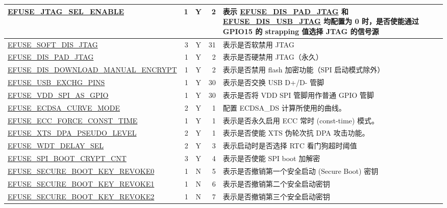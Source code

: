 \begin{longtable}[l]{ |m{8.2cm}|r|c|r|m{9.3cm}| }
    \hline
    \hyperref[fielddesc:EFUSEJTAGSELENABLE]{EFUSE\_JTAG\_SEL\_ENABLE} & 1 & Y & 2 & 表示 \hyperref[fielddesc:EFUSEDISPADJTAG]{EFUSE\_DIS\_PAD\_JTAG} 和 \hyperref[fielddesc:EFUSEDISUSBJTAG]{EFUSE\_DIS\_USB\_JTAG} 均配置为 0 时，是否使能通过 GPIO15 的 strapping 值选择 JTAG 的信号源\\
    \hline
    \hyperref[fielddesc:EFUSESOFTDISJTAG]{EFUSE\_SOFT\_DIS\_JTAG} & 3 & Y & 31 & 表示是否软禁用 JTAG\\
    \hline
    \hyperref[fielddesc:EFUSEDISPADJTAG]{EFUSE\_DIS\_PAD\_JTAG} & 1 & Y & 2 & 表示是否硬禁用 JTAG（永久） \\
    \hline
    \hyperref[fielddesc:EFUSEDISDOWNLOADMANUALENCRYPT]{EFUSE\_DIS\_DOWNLOAD\_MANUAL\_ENCRYPT} &  1 & Y & 2 & 表示是否禁用 flash 加密功能（SPI 启动模式除外）\\
    \hline
    \hyperref[fielddesc:EFUSEUSBEXCHGPINS]{EFUSE\_USB\_EXCHG\_PINS} & 1 & Y & 30 & 表示是否交换 USB D+/D- 管脚 \\
    \hline
    \hyperref[fielddesc:EFUSEVDDSPIASGPIO]{EFUSE\_VDD\_SPI\_AS\_GPIO} & 1 & Y & 30 & 表示是否将 VDD SPI 管脚用作普通 GPIO 管脚 \\
    \hline
    \hyperref[fielddesc:EFUSEECDSACURVEMODE]{EFUSE\_ECDSA\_CURVE\_MODE} & 2 & Y & 1 & 配置 ECDSA\_DS 计算所使用的曲线。 \\ \hline
    \hyperref[fielddesc:EFUSEECCFORCECONSTTIME]{EFUSE\_ECC\_FORCE\_CONST\_TIME}  & 1 & Y & 1 & 表示是否永久启用 ECC 常时 (const-time) 模式。 \\ \hline
    \hyperref[fielddesc:EFUSEXTSDPAPSEUDOLEVEL]{EFUSE\_XTS\_DPA\_PSEUDO\_LEVEL}  & 2 & Y & 1 & 表示是否使能 XTS 伪轮次抗 DPA 攻击功能。 \\ \hline
    \hyperref[fielddesc:EFUSEWDTDELAYSEL]{EFUSE\_WDT\_DELAY\_SEL} & 2 & Y & 3 & 表示启动时是否选择 RTC 看门狗超时阈值 \\
    \hline
    \hyperref[fielddesc:EFUSESPIBOOTCRYPTCNT]{EFUSE\_SPI\_BOOT\_CRYPT\_CNT} & 3 & Y & 4 & 表示是否使能 SPI boot 加解密\\
    \hline
    \hyperref[fielddesc:EFUSESECUREBOOTKEYREVOKE0]{EFUSE\_SECURE\_BOOT\_KEY\_REVOKE0} & 1 & N & 5 & 表示是否撤销第一个安全启动 (Secure Boot) 密钥 \\
    \hline
    \hyperref[fielddesc:EFUSESECUREBOOTKEYREVOKE1]{EFUSE\_SECURE\_BOOT\_KEY\_REVOKE1} & 1 & N & 6 & 表示是否撤销第二个安全启动密钥 \\
    \hline
    \hyperref[fielddesc:EFUSESECUREBOOTKEYREVOKE2]{EFUSE\_SECURE\_BOOT\_KEY\_REVOKE2} & 1 & N & 7 & 表示是否撤销第三个安全启动密钥 \\

\end{longtable}
